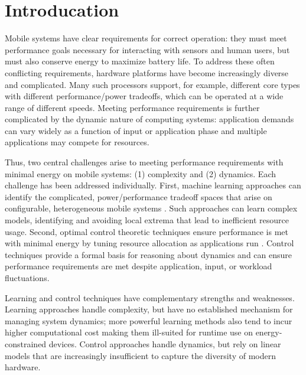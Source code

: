\section{Introducation}
Mobile systems have clear requirements for correct operation: they
must meet performance goals necessary for interacting with sensors and
human users, but must also conserve energy to maximize battery life.
To address these often conflicting requirements, hardware platforms
have become increasingly diverse and complicated.  Many such
processors support, for example, different core types with different
performance/power tradeoffs, which can be operated at a wide range of
different speeds.  Meeting performance requirements is further
complicated by the dynamic nature of computing systems: application
demands can vary widely as a function of input or application phase
and multiple applications may compete for resources.

Thus, two central challenges arise to meeting performance requirements
with minimal energy on mobile systems: (1) complexity and (2)
dynamics.  Each challenge has been addressed individually.  First,
machine learning approaches can identify the complicated,
power/performance tradeoff spaces that arise on configurable,
heterogeneous mobile systems \cite{}.  Such approaches can learn
complex models, identifying and avoiding local extrema that lead to
inefficient resource usage.  Second, optimal control theoretic
techniques ensure performance is met with minimal energy by tuning
resource allocation as applications run \cite{}.  Control techniques
provide a formal basis for reasoning about dynamics and can ensure
performance requirements are met despite application, input, or
workload fluctuations.

Learning and control techniques have complementary strengths and
weaknesses.  Learning approaches handle complexity, but have no
established mechanism for managing system dynamics; more powerful
learning methods also tend to incur higher computational cost making
them ill-suited for runtime use on energy-constrained devices.
Control approaches handle dynamics, but rely on linear models that are
increasingly insufficient to capture the diversity of modern hardware.

